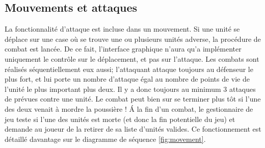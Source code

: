 \subsection{Mouvements et attaques}
La fonctionnalité d'attaque est incluse dans un mouvement. 
Si une unité se déplace sur une case où se trouve une ou plusieurs unités adverse, la procédure de combat est lancée.
De ce fait, l'interface graphique n'aura qu'a implémenter uniquement le contrôle sur le déplacement, et pas sur l'attaque.
\newline
Les combats sont réalisés séquentiellement eux aussi; l'attaquant attaque toujours au défenseur le plus fort, et lui porte un nombre d'attaque égal au nombre de points de vie de l'unité le plus important plus deux.
Il y a donc toujours au minimum 3 attaques de prévues contre une unité. Le combat peut bien sur se terminer plus tôt si l'une des deux venait à mordre la poussière !
\'A la fin d'un combat, le gestionnaire de jeu teste si l'une des unités est morte (et donc la fin potentielle du jeu) et demande au joueur de la retirer de sa liste d'unités valides.
Ce fonctionnement est détaillé davantage sur le diagramme de séquence \ref{fig:movement}.
